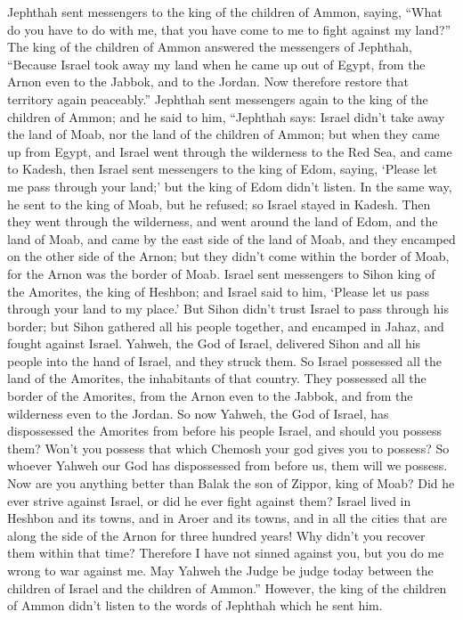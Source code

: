  Jephthah sent messengers to the king of the children of
Ammon, saying, ``What do you have to do with me, that you have come to
me to fight against my land?''  The king of the children
of Ammon answered the messengers of Jephthah, ``Because Israel took away
my land when he came up out of Egypt, from the Arnon even to the Jabbok,
and to the Jordan. Now therefore restore that territory again
peaceably.''  Jephthah sent messengers again to the king
of the children of Ammon;  and he said to him, ``Jephthah
says: Israel didn't take away the land of Moab, nor the land of the
children of Ammon;  but when they came up from Egypt, and
Israel went through the wilderness to the Red Sea, and came to Kadesh,
 then Israel sent messengers to the king of Edom, saying,
`Please let me pass through your land;' but the king of Edom didn't
listen. In the same way, he sent to the king of Moab, but he refused; so
Israel stayed in Kadesh.  Then they went through the
wilderness, and went around the land of Edom, and the land of Moab, and
came by the east side of the land of Moab, and they encamped on the
other side of the Arnon; but they didn't come within the border of Moab,
for the Arnon was the border of Moab.  Israel sent
messengers to Sihon king of the Amorites, the king of Heshbon; and
Israel said to him, `Please let us pass through your land to my place.'
 But Sihon didn't trust Israel to pass through his
border; but Sihon gathered all his people together, and encamped in
Jahaz, and fought against Israel.  Yahweh, the God of
Israel, delivered Sihon and all his people into the hand of Israel, and
they struck them. So Israel possessed all the land of the Amorites, the
inhabitants of that country.  They possessed all the
border of the Amorites, from the Arnon even to the Jabbok, and from the
wilderness even to the Jordan.  So now Yahweh, the God of
Israel, has dispossessed the Amorites from before his people Israel, and
should you possess them?  Won't you possess that which
Chemosh your god gives you to possess? So whoever Yahweh our God has
dispossessed from before us, them will we possess.  Now
are you anything better than Balak the son of Zippor, king of Moab? Did
he ever strive against Israel, or did he ever fight against them?
 Israel lived in Heshbon and its towns, and in Aroer and
its towns, and in all the cities that are along the side of the Arnon
for three hundred years! Why didn't you recover them within that time?
 Therefore I have not sinned against you, but you do me
wrong to war against me. May Yahweh the Judge be judge today between the
children of Israel and the children of Ammon.''  However,
the king of the children of Ammon didn't listen to the words of Jephthah
which he sent him.

